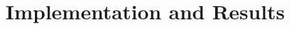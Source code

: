 \documentclass[10pt,a4paper]{article}
\begin{document}
\section{Implementation and Results}
\label{sec:impl}

 
\end{document}
